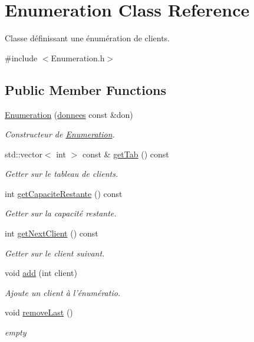 \hypertarget{classEnumeration}{\section{\-Enumeration \-Class \-Reference}
\label{classEnumeration}
}


\-Classe définissant une énumération de clients.  




{\ttfamily \#include $<$\-Enumeration.\-h$>$}

\subsection*{\-Public \-Member \-Functions}
\begin{DoxyCompactItemize}
\item 
\hyperlink{classEnumeration_a18ef77b8870e03938ddea0728ede0f06}{\-Enumeration} (\hyperlink{structdonnees}{donnees} const \&don)
\begin{DoxyCompactList}\small\item\em \-Constructeur de \hyperlink{classEnumeration}{\-Enumeration}. \end{DoxyCompactList}\item 
std\-::vector$<$ int $>$ const \& \hyperlink{classEnumeration_aa6d9aef6ae88861097dd900f3c33be43}{get\-Tab} () const 
\begin{DoxyCompactList}\small\item\em \-Getter sur le tableau de clients. \end{DoxyCompactList}\item 
int \hyperlink{classEnumeration_a819f23f4f009be4ff562fcdd1918d1ca}{get\-Capacite\-Restante} () const 
\begin{DoxyCompactList}\small\item\em \-Getter sur la capacité restante. \end{DoxyCompactList}\item 
int \hyperlink{classEnumeration_ab75f6eeeaacd76611fbcb530d2760f87}{get\-Next\-Client} () const 
\begin{DoxyCompactList}\small\item\em \-Getter sur le client suivant. \end{DoxyCompactList}\item 
void \hyperlink{classEnumeration_a716f90ba3d195719362619fd1d4fb5d0}{add} (int client)
\begin{DoxyCompactList}\small\item\em \-Ajoute un client à l'énumératio. \end{DoxyCompactList}\item 
void \hyperlink{classEnumeration_abf53c7897ed2c65544c64d31dc2901a1}{remove\-Last} ()
\begin{DoxyCompactList}\small\item\em empty \end{DoxyCompactList}\end{DoxyCompactItemize}
